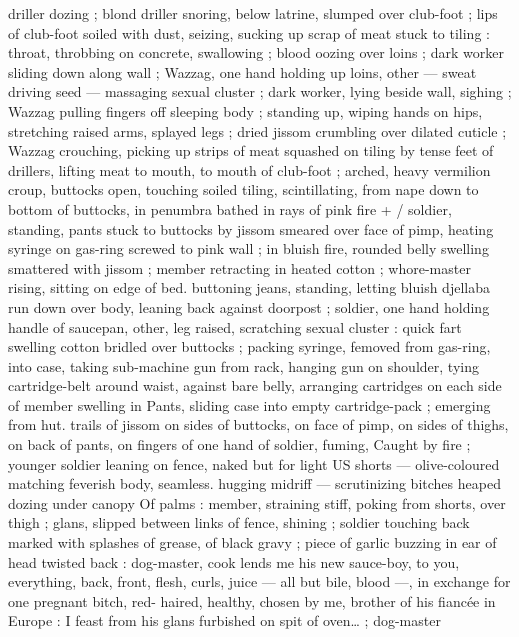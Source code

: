 driller dozing ; blond driller snoring, below latrine, slumped over 
club-foot ; lips of club-foot soiled with dust, seizing, sucking up 
scrap of meat stuck to tiling : throat, throbbing on concrete, 
swallowing ; blood oozing over loins ; dark worker sliding down along 
wall ; Wazzag, one hand holding up loins, other --- sweat driving 
seed --- massaging sexual cluster ; dark worker, lying beside wall, 
sighing ; Wazzag pulling fingers off sleeping body ; standing up, 
wiping hands on hips, stretching raised arms, splayed legs ; dried 
jissom crumbling over dilated cuticle ; Wazzag crouching, picking up 
strips of meat squashed on tiling by tense feet of drillers, lifting 
meat to mouth, to mouth of club-foot ; arched, heavy vermilion 
croup, buttocks open, touching soiled tiling, scintillating, from nape 
down to bottom of buttocks, in penumbra bathed in rays of pink fire 
+ {\slash} soldier, standing, pants stuck to buttocks by jissom smeared over 
face of pimp, heating syringe on gas-ring screwed to pink wall ; in 
bluish fire, rounded belly swelling smattered with jissom ; member 
retracting in heated cotton ; whore-master rising, sitting on edge of 
bed. buttoning jeans, standing, letting bluish djellaba run down over 
body, leaning back against doorpost ; soldier, one hand holding 
handle of saucepan, other, leg raised, scratching sexual cluster : 
quick fart swelling cotton bridled over buttocks ; packing syringe, 
femoved from gas-ring, into case, taking sub-machine gun from rack, 
hanging gun on shoulder, tying cartridge-belt around waist, against 
bare belly, arranging cartridges on each side of member swelling in 
Pants, sliding case into empty cartridge-pack ; emerging from hut. 
trails of jissom on sides of buttocks, on face of pimp, on sides of 
thighs, on back of pants, on fingers of one hand of soldier, fuming, 
Caught by fire ; younger soldier leaning on fence, naked but for light 
US shorts --- olive-coloured matching feverish body, seamless. 
hugging midriff --- scrutinizing bitches heaped dozing under canopy 
Of palms : member, straining stiff, poking from shorts, over thigh ; 
glans, slipped between links of fence, shining ; soldier touching back 
marked with splashes of grease, of black gravy ; piece of garlic 
buzzing in ear of head twisted back : {\gl}{\td} dog-master, cook lends me 
his new sauce-boy, to you, everything, back, front, flesh, curls, juice 
--- all but bile, blood ---, in exchange for one pregnant bitch, red- 
haired, healthy, chosen by me, brother of his fiancée in Europe : I 
feast from his glans furbished on spit of oven{\ldots} {\gr} ; dog-master 
